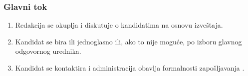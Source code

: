 \subsubsection{Glavni tok}
\begin{enumerate} 
\item Redakcija se okuplja i diskutuje o kandidatima na osnovu izveštaja. 
\item Kandidat se bira ili jednoglasno ili, ako to nije moguće, po izboru glavnog odgovornog urednika.
\item Kandidat se kontaktira i administracija obavlja formalnosti zapošljavanja .
\end{enumerate}

